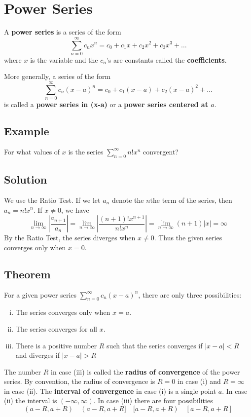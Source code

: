 \section{Power Series}

A \textbf{power series} is a series of the form
$$ \sum_{n=0}^\infty c_nx^n = c_0+c_1x+c_2x^2+c_3x^3+\dots $$
where $x$ is the variable and the $c_n$'s are constants called the \textbf{coefficients}.

More generally, a series of the form
$$ \sum_{n=0}^\infty c_n(x-a)^n = c_0+c_1(x-a)+c_2(x-a)^2+\dots$$
is called a \textbf{power series in (x-a)} or a \textbf{power series centered at $a$}.

\subsection*{Example}
For what values of $x$ is the series $\sum_{n=0}^\infty n!x^n$ convergent?

\subsection*{Solution}
We use the Ratio Test. If we let $a_n$ denote the $n$the term of the series,
then $a_n=n!x^n$. If $x \neq 0$, we have
$$ \lim_{n \to \infty}\left|\frac{a_{n+1}}{a_n}\right|=\lim_{n \to \infty}
    \left|\frac{(n+1)!x^{n+1}}{n!x^n}\right|=\lim_{n \to \infty}(n+1)|x|=\infty $$
By the Ratio Test, the series diverges when $x \neq 0$. Thus the given series converges
only when $x=0$.

\subsection*{Theorem}
For a given power series $\sum_{n=0}^\infty c_n(x-a)^n$, there are only three possibilities:
\begin{enumerate}[(i)]
    \item The series converges only when $x=a$.
    \item The series converges for all $x$.
    \item There is a positive number $R$ such that the series converges if $|x-a|<R$
          and diverges if $|x-a|>R$
\end{enumerate}

The number $R$ in case (iii) is called the \textbf{radius of convergence} of the power
series. By convention, the radius of convergence is $R=0$ in case (i) and $R=\infty$
in case (ii). The \textbf{interval of convergence} in case (i) is a single point $a$.
In case (ii) the interval is $(-\infty,\infty)$. In case (iii) there are four possibilities
$$(a-R,a+R) \quad (a-R,a+R] \quad[a-R,a+R) \quad [a-R,a+R]$$

